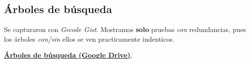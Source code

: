 
\FloatBarrier

\subsection{Árboles de búsqueda}\label{sec:01-sudoku-arboles}
Se capturaron con \textit{Gecode Gist}. Mostramos \textbf{solo} pruebas \emph{con} redundancias, pues los árboles \emph{con/sin} ellos se ven practicamente indenticos.

\href{https://drive.google.com/drive/folders/125bijiUVxOe8lKL5cBToh5QjyLDW0jIM?usp=sharing}{\textbf{Árboles de búsqueda (Google Drive)}}.